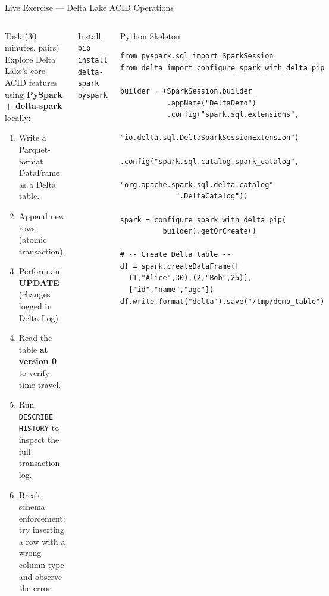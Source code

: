 \documentclass[aspectratio=169,10pt]{beamer}
\begin{document}
\begin{frame}[fragile]{Live Exercise — Delta Lake ACID Operations}
  \begin{columns}[T]
      \begin{block}{Task (30 minutes, pairs)}
        Explore Delta Lake's core ACID features using
        \textbf{PySpark + delta-spark} locally:
        \begin{enumerate}\setlength\itemsep{1pt}
          \item Write a Parquet-format DataFrame as a Delta table.
          \item Append new rows (atomic transaction).
          \item Perform an \textbf{UPDATE} (changes logged in
                Delta Log).
          \item Read the table \textbf{at version 0} to verify
                time travel.
          \item Run \texttt{DESCRIBE HISTORY} to inspect the
                full transaction log.
          \item Break schema enforcement: try inserting a row
                with a wrong column type and observe the error.
        \end{enumerate}
      \end{block}
      \vspace{4pt}
      \begin{exampleblock}{Install}
        \scriptsize
        \texttt{pip install delta-spark pyspark}
      \end{exampleblock}

      \begin{exampleblock}{Python Skeleton}
        \scriptsize
        \begin{verbatim}
from pyspark.sql import SparkSession
from delta import configure_spark_with_delta_pip

builder = (SparkSession.builder
           .appName("DeltaDemo")
           .config("spark.sql.extensions",
             "io.delta.sql.DeltaSparkSessionExtension")
           .config("spark.sql.catalog.spark_catalog",
             "org.apache.spark.sql.delta.catalog"
             ".DeltaCatalog"))

spark = configure_spark_with_delta_pip(
          builder).getOrCreate()

# -- Create Delta table --
df = spark.createDataFrame([
  (1,"Alice",30),(2,"Bob",25)],
  ["id","name","age"])
df.write.format("delta").save("/tmp/demo_table")


\end{verbatim}
\end{exampleblock}
\end{columns}
\end{frame}
\end{document}
